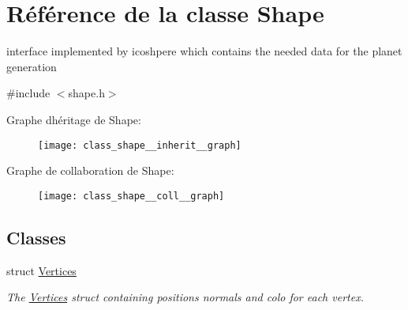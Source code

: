 \hypertarget{class_shape}{}\section{Référence de la classe Shape}
\label{class_shape}


interface implemented by icoshpere which contains the needed data for the planet generation  




{\ttfamily \#include $<$shape.\+h$>$}



Graphe d\textquotesingle{}héritage de Shape\+:\nopagebreak
\begin{figure}[H]
\begin{center}
\leavevmode
\texttt{[image: class\_shape\_\_inherit\_\_graph]}
\end{center}
\end{figure}


Graphe de collaboration de Shape\+:\nopagebreak
\begin{figure}[H]
\begin{center}
\leavevmode
\texttt{[image: class\_shape\_\_coll\_\_graph]}
\end{center}
\end{figure}
\subsection*{Classes}
\begin{DoxyCompactItemize}
\item 
struct \hyperlink{struct_shape_1_1_vertices}{Vertices}
\begin{DoxyCompactList}\small\item\em The \hyperlink{struct_shape_1_1_vertices}{Vertices} struct containing positions normals and colo for each vertex. \end{DoxyCompactList}\end{DoxyCompactItemize}
